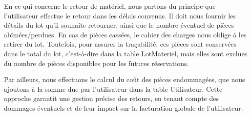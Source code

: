 En ce qui concerne le retour de matériel, nous partons du principe que l'utilisateur effectue le retour dans les délais convenus. Il doit nous fournir les détails du lot qu'il souhaite retourner, ainsi que le nombre éventuel de pièces abîmées/perdues. En cas de pièces cassées, le cahier des charges nous oblige à les retirer du lot. Toutefois, pour assurer la traçabilité, ces pièces sont conservées dans le total du lot, c'est-à-dire dans la table LotMateriel, mais elles sont exclues du nombre de pièces disponibles pour les futures réservations.

Par ailleurs, nous effectuons le calcul du coût des pièces endommagées, que nous ajoutons à la somme due par l'utilisateur dans la table Utilisateur. Cette approche garantit une gestion précise des retours, en tenant compte des dommages éventuels et de leur impact sur la facturation globale de l'utilisateur.








